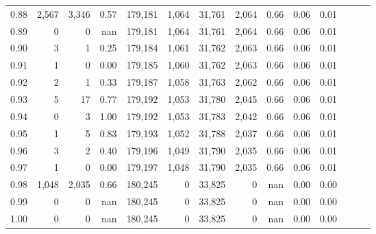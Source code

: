 \begin{tabular}{rrrrrrrrrrrrrr}
0.88 &   2,567 &  3,346 &  0.57 &  179,181 &    1,064 &  31,761 &   2,064 &  0.66 &  0.06 &      0.01 \\
0.89 &       0 &      0 &   nan &  179,181 &    1,064 &  31,761 &   2,064 &  0.66 &  0.06 &      0.01 \\
0.90 &       3 &      1 &  0.25 &  179,184 &    1,061 &  31,762 &   2,063 &  0.66 &  0.06 &      0.01 \\
0.91 &       1 &      0 &  0.00 &  179,185 &    1,060 &  31,762 &   2,063 &  0.66 &  0.06 &      0.01 \\
0.92 &       2 &      1 &  0.33 &  179,187 &    1,058 &  31,763 &   2,062 &  0.66 &  0.06 &      0.01 \\
0.93 &       5 &     17 &  0.77 &  179,192 &    1,053 &  31,780 &   2,045 &  0.66 &  0.06 &      0.01 \\
0.94 &       0 &      3 &  1.00 &  179,192 &    1,053 &  31,783 &   2,042 &  0.66 &  0.06 &      0.01 \\
0.95 &       1 &      5 &  0.83 &  179,193 &    1,052 &  31,788 &   2,037 &  0.66 &  0.06 &      0.01 \\
0.96 &       3 &      2 &  0.40 &  179,196 &    1,049 &  31,790 &   2,035 &  0.66 &  0.06 &      0.01 \\
0.97 &       1 &      0 &  0.00 &  179,197 &    1,048 &  31,790 &   2,035 &  0.66 &  0.06 &      0.01 \\
0.98 &   1,048 &  2,035 &  0.66 &  180,245 &        0 &  33,825 &       0 &   nan &  0.00 &      0.00 \\
0.99 &       0 &      0 &   nan &  180,245 &        0 &  33,825 &       0 &   nan &  0.00 &      0.00 \\
1.00 &       0 &      0 &   nan &  180,245 &        0 &  33,825 &       0 &   nan &  0.00 &      0.00 \\
\bottomrule
\end{tabular}

